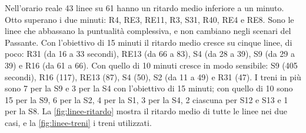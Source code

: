 Nell'orario reale 43 linee su 61 hanno un ritardo medio inferiore a un minuto. Otto superano i due minuti: R4, RE3, RE11, R3, S31, R40, RE4 e RE8. Sono le linee che abbassano la puntualità complessiva, e non cambiano negli scenari del Passante. Con l'obiettivo di 15 minuti il ritardo medio cresce su cinque linee, di poco: R31 (da 16 a 33 secondi), RE13 (da 66 a 83), S4 (da 28 a 39), S9 (da 29 a 39) e R16 (da 61 a 66). Con quello di 10 minuti cresce in modo sensibile: S9 (405 secondi), R16 (117), RE13 (87), S4 (50), S2 (da 11 a 49) e R31 (47). I treni in più sono 7 per la S9 e 3 per la S4 con l'obiettivo di 15 minuti; con quello di 10 sono 15 per la S9, 6 per la S2, 4 per la S1, 3 per la S4, 2 ciascuna per S12 e S13 e 1 per la S8. La \cref{fig:linee-ritardo} mostra il ritardo medio di tutte le linee nei due casi, e la \cref{fig:linee-treni} i treni utilizzati.

